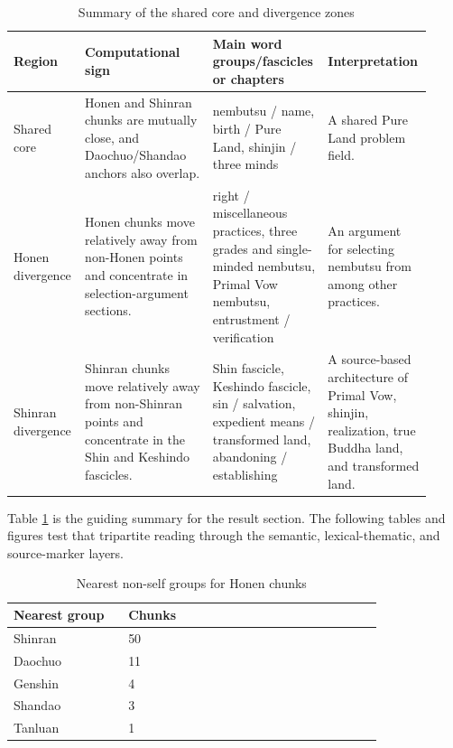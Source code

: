\documentclass[uplatex,dvipdfmx,11pt,a4paper]{jsarticle}
\begin{document}
\begin{table}[H]
\centering
\footnotesize
\setlength{\tabcolsep}{2pt}
\caption{Summary of the shared core and divergence zones}
\label{tab:shared-protrusion-summary}
\begin{tabular}{@{}p{0.15\linewidth}p{0.30\linewidth}p{0.27\linewidth}p{0.20\linewidth}@{}}
\toprule
Region & Computational sign & Main word groups/fascicles or chapters & Interpretation \\
\midrule
Shared core & Honen and Shinran chunks are mutually close, and Daochuo/Shandao anchors also overlap. & nembutsu / name, birth / Pure Land, shinjin / three minds & A shared Pure Land problem field. \\
Honen divergence & Honen chunks move relatively away from non-Honen points and concentrate in selection-argument sections. & right / miscellaneous practices, three grades and single-minded nembutsu, Primal Vow nembutsu, entrustment / verification & An argument for selecting nembutsu from among other practices. \\
Shinran divergence & Shinran chunks move relatively away from non-Shinran points and concentrate in the Shin and Keshindo fascicles. & Shin fascicle, Keshindo fascicle, sin / salvation, expedient means / transformed land, abandoning / establishing & A source-based architecture of Primal Vow, shinjin, realization, true Buddha land, and transformed land. \\
\bottomrule
\end{tabular}
\end{table}

Table \ref{tab:shared-protrusion-summary} is the guiding summary for the result section. The following tables and figures test that tripartite reading through the semantic, lexical-thematic, and source-marker layers.

\begin{table}[H]
\centering
\footnotesize
\setlength{\tabcolsep}{2pt}
\caption{Nearest non-self groups for Honen chunks}
\label{tab:honen-nearest}
\begin{tabular}{@{}p{0.28\linewidth}p{0.62\linewidth}@{}}
\toprule
Nearest group & Chunks \\
\midrule
Shinran & 50 \\
Daochuo & 11 \\
Genshin & 4 \\
Shandao & 3 \\
Tanluan & 1 \\
\bottomrule
\end{tabular}
\end{table}
\end{document}
